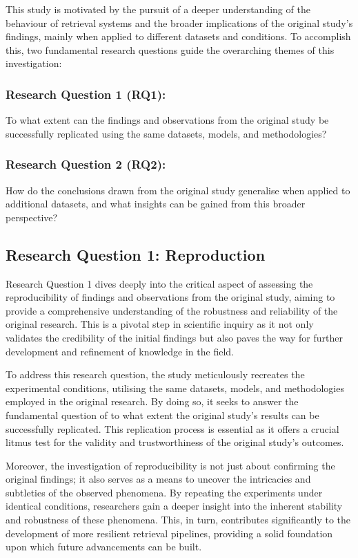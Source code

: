 This study is motivated by the pursuit of a deeper understanding of the behaviour of retrieval systems and the broader implications of the original study's findings, mainly when applied to different datasets and conditions. To accomplish this, two fundamental research questions guide the overarching themes of this investigation:

\subsubsection{Research Question 1 (RQ1):}
To what extent can the findings and observations from the original study be successfully replicated using the same datasets, models, and methodologies?

\subsubsection{Research Question 2 (RQ2):}
How do the conclusions drawn from the original study generalise when applied to additional datasets, and what insights can be gained from this broader perspective?

\subsection{Research Question 1: Reproduction}
Research Question 1 dives deeply into the critical aspect of assessing the reproducibility of findings and observations from the original study, aiming to provide a comprehensive understanding of the robustness and reliability of the original research. This is a pivotal step in scientific inquiry as it not only validates the credibility of the initial findings but also paves the way for further development and refinement of knowledge in the field.

To address this research question, the study meticulously recreates the experimental conditions, utilising the same datasets, models, and methodologies employed in the original research. By doing so, it seeks to answer the fundamental question of to what extent the original study's results can be successfully replicated. This replication process is essential as it offers a crucial litmus test for the validity and trustworthiness of the original study's outcomes.

Moreover, the investigation of reproducibility is not just about confirming the original findings; it also serves as a means to uncover the intricacies and subtleties of the observed phenomena. By repeating the experiments under identical conditions, researchers gain a deeper insight into the inherent stability and robustness of these phenomena. This, in turn, contributes significantly to the development of more resilient retrieval pipelines, providing a solid foundation upon which future advancements can be built.


